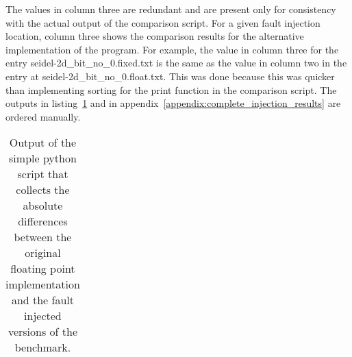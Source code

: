 The values in column three are redundant and are present only for consistency with the actual output of the comparison script. For a given fault injection location, column three shows the comparison results for the alternative implementation of the program. For example, the value in column three for the entry seidel-2d\_bit\_no\_0.fixed.txt is the same as the value in column two in the entry at seidel-2d\_bit\_no\_0.float.txt. This was done because this was quicker than implementing sorting for the print function in the comparison script. The outputs in listing~\ref{table:injection_results} and in appendix~\ref{appendix:complete_injection_results} are ordered manually.


\begin{table}
\caption{Output of the simple python script that collects the absolute differences between the original floating point implementation and the fault injected versions of the benchmark.}
\label{table:injection_results}
\begin{tabular}{lll}
   


\end{tabular}
\end{table}
